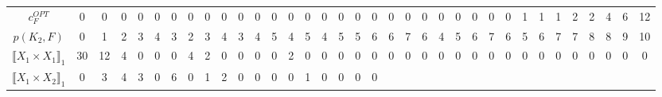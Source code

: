 \documentclass[12pt]{article}
\theoremstyle{definition}
\theoremstyle{remark}
\begin{document}
{\begin{table}[H]
\begin{adjustbox}{angle=90}
{\begin{tabular}{c||c|c|c|c|c|c|c|c|c|c|c|c|c|c|c|c|c|c|c|c|c|c|c|c|c|c|c|c|c|c|c|c|c|c}
\begin{tikzpicture}
\end{tikzpicture} 
\\
\hline\hline
$c_F^{OPT}$ &
0 & 0 & 0 & 0 & 0 & 0 & 0 & 0 & 0 & 0 & 0 & 0 & 0 & 0 & 0 & 0 & 0 & 0 & 0 & 0 & 0 & 0 & 0 & 0 & 0 & 0 & 1 & 1 & 1 & 2 & 2 & 4 & 6 &12
\\
\hline\hline
$p(K_2,F)$ &
0 &1 & 2 & 3 & 4 & 3 & 2 & 3 & 4 & 3 & 4 & 5 & 4 & 5 & 4 & 5 & 5 & 6 & 6 & 7 & 6 & 4 & 5 & 6 & 7 & 6 & 5 & 6 & 7 & 7 & 8 & 8 & 9 & 10
\\
\hline\hline
$\llbracket X_1 \times X_1 \rrbracket_1$ &
30  & %
12  & %
4  & %
0  & %
0  & %
0  & %
4  & %
2  & %
0  & %
0  & %
0  & %
0  & %
2  & %
0  & %
0  & %
0  & %
0  & %
0  & %
0  & %
0  & %
0  & %
0  & %
0  & %
0  & %
0  & %
0  & %
0  & %
0  & %
0  & %
0  & %
0  & %
0  & %
0  & %
0   %
\\
$\llbracket X_1 \times X_2 \rrbracket_1$ &
0  & %
3  & %
4  & %
3  & %
0  & %
6  & %
0  & %
1  & %
2  & %
0  & %
0  & %
0  & %
0  & %
1  & %
0  & %
0  & %
0  & %
0  & %

\end{tabular}}
\end{adjustbox}
\end{table}}
\end{document}
